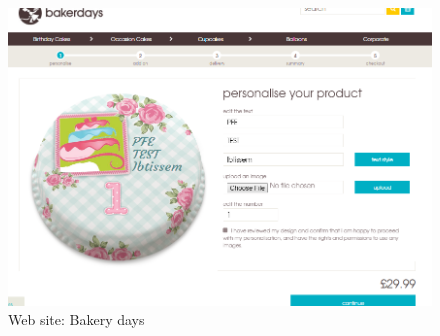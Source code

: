 \documentclass[12pt,a4paper]{report}
\begin{document}
	
	\begin{figure}[H]
		\centering
		\includegraphics[width=7in,keepaspectratio]{bakerydays.png}
		\caption{Web site: Bakery days\protect{}\protect\footnotemark[\thefootnote]}
		
		\label{label-zomato}
	\end{figure}
\end{document}
